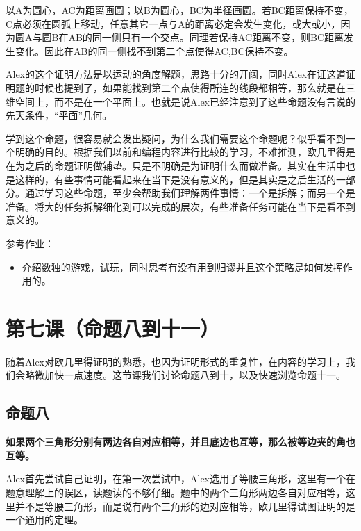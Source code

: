 \documentclass[
]{book}
\providecommand{\tightlist}{%
  \setlength{\itemsep}{0pt}\setlength{\parskip}{0pt}}
\begin{document}
以A为圆心，AC为距离画圆；以B为圆心，BC为半径画圆。若BC距离保持不变，C点必须在圆弧上移动，任意其它一点与A的距离必定会发生变化，或大或小，因为圆A与圆B在AB的同一侧只有一个交点。同理若保持AC距离不变，则BC距离发生变化。因此在AB的同一侧找不到第二个点使得AC,BC保持不变。

Alex的这个证明方法是以运动的角度解题，思路十分的开阔，同时Alex在证这道证明题的时候也提到了，如果能找到第二个点使得所连的线段都相等，那么就是在三维空间上，而不是在一个平面上。也就是说Alex已经注意到了这些命题没有言说的先天条件，``平面''几何。

学到这个命题，很容易就会发出疑问，为什么我们需要这个命题呢？似乎看不到一个明确的目的。根据我们以前和编程内容进行比较的学习，不难推测，欧几里得是在为之后的命题证明做铺垫。只是不明确是为证明什么而做准备。其实在生活中也是这样的，有些事情可能看起来在当下是没有意义的，但是其实是之后生活的一部分。通过学习这些命题，至少会帮助我们理解两件事情：一个是拆解；而另一个是准备。将大的任务拆解细化到可以完成的层次，有些准备任务可能在当下是看不到意义的。

参考作业：

\begin{itemize}
\tightlist
\item
  介绍数独的游戏，试玩，同时思考有没有用到归谬并且这个策略是如何发挥作用的。
\end{itemize}

\hypertarget{ux7b2cux4e03ux8bfeux547dux9898ux516bux5230ux5341ux4e00}{%
\chapter{第七课（命题八到十一）}\label{ux7b2cux4e03ux8bfeux547dux9898ux516bux5230ux5341ux4e00}}

随着Alex对欧几里得证明的熟悉，也因为证明形式的重复性，在内容的学习上，我们会略微加快一点速度。这节课我们讨论命题八到十，以及快速浏览命题十一。

\hypertarget{ux547dux9898ux516b}{%
\section{命题八}\label{ux547dux9898ux516b}}

\textbf{如果两个三角形分别有两边各自对应相等，并且底边也互等，那么被等边夹的角也互等。}

Alex首先尝试自己证明，在第一次尝试中，Alex选用了等腰三角形，这里有一个在题意理解上的误区，读题读的不够仔细。题中的两个三角形两边各自对应相等，这里并不是等腰三角形，而是说有两个三角形的边对应相等，欧几里得试图证明的是一个通用的定理。
\end{document}
